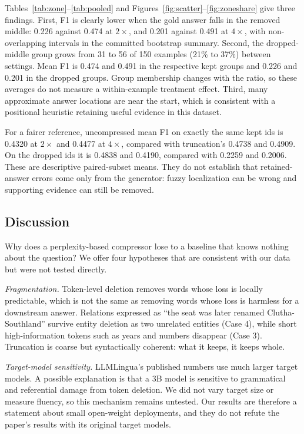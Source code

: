 \documentclass[10pt,a4paper,twocolumn]{article}
\begin{document}
Tables~\ref{tab:zone}--\ref{tab:pooled} and Figures~\ref{fig:scatter}--\ref{fig:zoneshare}
give three findings. First, F1 is clearly lower when the gold answer falls in the
removed middle: 0.226 against 0.474 at $2\times$, and 0.201 against 0.491 at
$4\times$, with non-overlapping intervals in the committed bootstrap summary. Second, the dropped-middle group grows from 31 to 56 of 150 examples
(21\% to 37\%) between settings. Mean F1 is 0.474 and 0.491 in the respective
kept groups and 0.226 and 0.201 in the dropped groups. Group membership changes
with the ratio, so these averages do not measure a within-example treatment effect.
Third, many approximate answer locations are near the start, which is consistent
with a positional heuristic retaining useful evidence in this dataset.

For a fairer reference, uncompressed mean F1 on exactly the same kept ids is
0.4320 at $2\times$ and 0.4477 at $4\times$, compared with truncation's 0.4738
and 0.4909. On the dropped ids it is 0.4838 and 0.4190, compared with 0.2259
and 0.2006. These are descriptive paired-subset means. They do not establish
that retained-answer errors come only from the generator: fuzzy localization can
be wrong and supporting evidence can still be removed.

\subsection{Discussion}

Why does a perplexity-based compressor lose to a baseline that knows nothing about
the question? We offer four hypotheses that are consistent with our data but were not tested directly.

\emph{Fragmentation.} Token-level deletion removes words whose loss is locally
predictable, which is not the same as removing words whose loss is harmless for a
downstream answer. Relations expressed as ``the seat was later renamed
Clutha-Southland'' survive entity deletion as two unrelated entities (Case 4),
while short high-information tokens such as years and numbers disappear (Case 3).
Truncation is coarse but syntactically coherent: what it keeps, it keeps whole.

\emph{Target-model sensitivity.} LLMLingua's published numbers use much larger
target models. A possible explanation is that a 3B model is sensitive to grammatical and referential damage from token deletion. We did not vary target size or measure fluency, so this mechanism remains untested. Our results are
therefore a statement about small open-weight deployments, and they do not refute
the paper's results with its original target models.
\end{document}
